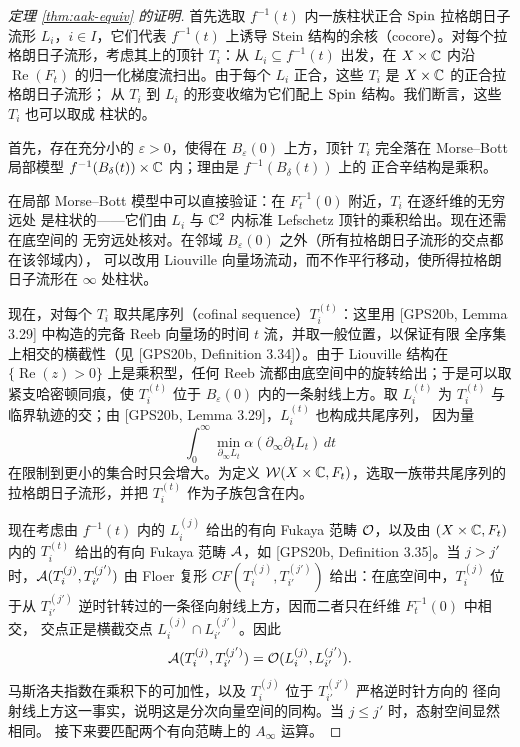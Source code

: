 \begin{proof}[定理 \ref{thm:aak-equiv} 的证明]
首先选取 $f^{-1}(t)$ 内一族柱状正合 $\mathrm{Spin}$ 拉格朗日子流形 $L_i$，$i\in I$，它们代表
$f^{-1}(t)$ 上诱导 Stein 结构的余核（cocore）。对每个拉格朗日子流形，考虑其上的顶针
$T_i$：从 $L_i\subseteq f^{-1}(t)$ 出发，在 $X\times\mathbb{C}$ 内沿 $\operatorname{Re}(F_t)$
的归一化梯度流扫出。由于每个 $L_i$ 正合，这些 $T_i$ 是 $X\times\mathbb{C}$ 的正合拉格朗日子流形；
从 $T_i$ 到 $L_i$ 的形变收缩为它们配上 $\mathrm{Spin}$ 结构。我们断言，这些 $T_i$ 也可以取成
柱状的。


首先，存在充分小的 $\varepsilon>0$，使得在 $B_\varepsilon(0)$ 上方，顶针 $T_i$ 完全落在
Morse--Bott 局部模型 $f^{-1}(B_\delta(t))\times\mathbb{C}$ 内；理由是 $f^{-1}(B_\delta(t))$ 上的
正合辛结构是乘积。

在局部 Morse--Bott 模型中可以直接验证：在 $F_t^{-1}(0)$ 附近，$T_i$ 在逐纤维的无穷远处
是柱状的——它们由 $L_i$ 与 $\mathbb{C}^2$ 内标准 Lefschetz 顶针的乘积给出。现在还需在底空间的
无穷远处核对。在邻域 $B_\varepsilon(0)$ 之外（所有拉格朗日子流形的交点都在该邻域内），
可以改用 Liouville 向量场流动，而不作平行移动，使所得拉格朗日子流形在 $\infty$ 处柱状。

现在，对每个 $T_i$ 取共尾序列（cofinal sequence）$T_i^{(t)}$：这里用
[GPS20b, Lemma 3.29] 中构造的完备 Reeb 向量场的时间 $t$ 流，并取一般位置，以保证有限
全序集上相交的横截性（见 [GPS20b, Definition 3.34]）。由于 Liouville 结构在
$\{\operatorname{Re}(z)>0\}$ 上是乘积型，任何 Reeb 流都由底空间中的旋转给出；于是可以取
紧支哈密顿同痕，使 $T_i^{(t)}$ 位于 $B_\varepsilon(0)$ 内的一条射线上方。取 $L_i^{(t)}$
为 $T_i^{(t)}$ 与临界轨迹的交；由 [GPS20b, Lemma 3.29]，$L_i^{(t)}$ 也构成共尾序列，
因为量
\[
\int_0^\infty \min_{\partial_\infty L_t}\alpha(\partial_\infty\partial_t L_t)\,dt
\]
在限制到更小的集合时只会增大。为定义 $\mathcal{W}(X\times\mathbb{C},F_t)$，选取一族带共尾序列的
拉格朗日子流形，并把 $T_i^{(t)}$ 作为子族包含在内。


现在考虑由 $f^{-1}(t)$ 内的 $L_i^{(j)}$ 给出的有向 Fukaya 范畴 $\mathcal{O}$，以及由
$(X\times\mathbb{C},F_t)$ 内的 $T_i^{(t)}$ 给出的有向 Fukaya 范畴 $\mathcal{A}$，如
[GPS20b, Definition 3.35]。当 $j>j'$ 时，$\mathcal{A}(T_i^{(j)},T_{i'}^{(j')})$ 由 Floer 复形
$CF(T_i^{(j)},T_{i'}^{(j')})$ 给出：在底空间中，$T_i^{(j)}$ 位于从
$T_{i'}^{(j')}$ 逆时针转过的一条径向射线上方，因而二者只在纤维 $F_t^{-1}(0)$ 中相交，
交点正是横截交点 $L_i^{(j)}\cap L_{i'}^{(j')}$。因此
\[
\mathcal{A}(T_i^{(j)},T_{i'}^{(j')})=\mathcal{O}(L_i^{(j)},L_{i'}^{(j')}).
\]
马斯洛夫指数在乘积下的可加性，以及 $T_i^{(j)}$ 位于 $T_{i'}^{(j')}$ 严格逆时针方向的
径向射线上方这一事实，说明这是分次向量空间的同构。当 $j\le j'$ 时，态射空间显然相同。
接下来要匹配两个有向范畴上的 $A_\infty$ 运算。


\end{proof}
